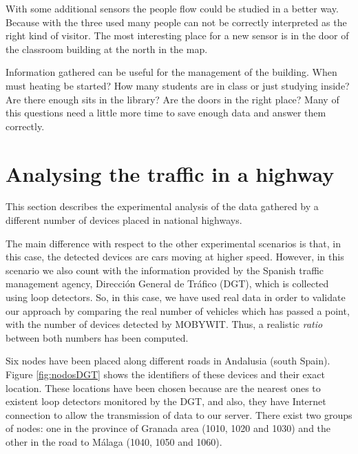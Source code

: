 \documentclass[preprint]{elsarticle}
\begin{document}
With some additional sensors the people flow could be studied in a better way. Because with the three used many people can not be correctly interpreted as the right kind of visitor. The most interesting place for a new sensor is in the door of the classroom building at the north in the map.

Information gathered can be useful for the management of the building. When must heating be started? How many students are in class or just studying inside? Are there enough sits in the library? Are the doors in the right place? Many of this questions need a little more time to save enough data and answer them correctly.


\section{Analysing the traffic in a highway}
\label{sec:traffic}

This section describes the experimental analysis of the data gathered by a 
different number of devices placed in national highways.

The main difference with respect to the other experimental scenarios is that, 
in this case, the detected devices are cars moving at higher speed. However, 
in this scenario we also count with the information provided by the Spanish 
traffic management agency, Direcci\'on General de Tr\'afico (DGT), which is 
collected using loop detectors. So, in this case, we have used real data in 
order to validate our approach by comparing the real number of vehicles which 
has passed a point, with the number of devices detected by MOBYWIT. Thus, a 
realistic \textit{ratio} between both numbers has been computed.

Six nodes have been placed along different roads in Andalusia (south Spain). 
Figure \ref{fig:nodosDGT} shows the identifiers of these devices and their 
exact location. These locations have been chosen because are the nearest   %
ones to existent loop detectors monitored by the DGT, and also, they have 
Internet connection to allow the transmission of data to our server. 
There exist two groups of nodes: one in the province of Granada area 
(1010, 1020 and 1030) and the other in the road to M{\'a}laga (1040, 1050 and 1060).
\end{document}
